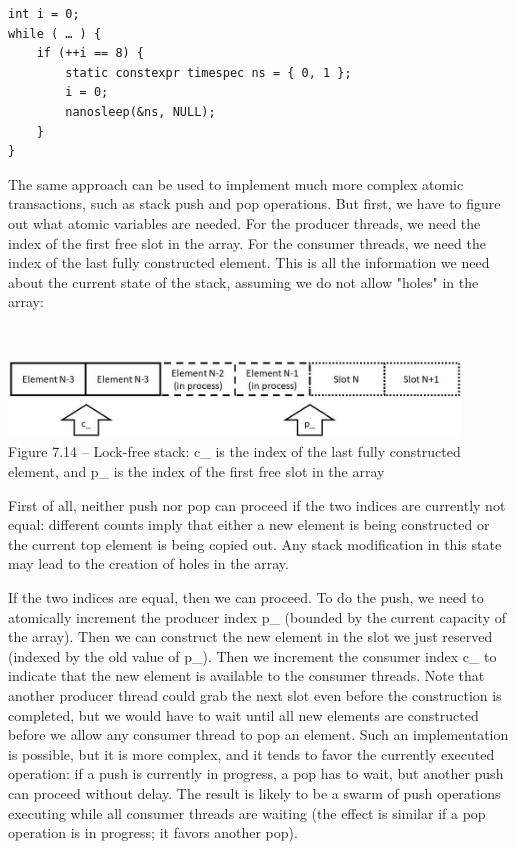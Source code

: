 \begin{lstlisting}[style=styleCXX]
int i = 0;
while ( … ) {
	if (++i == 8) {
		static constexpr timespec ns = { 0, 1 };
		i = 0;
		nanosleep(&ns, NULL);
	}
}
\end{lstlisting}

The same approach can be used to implement much more complex atomic transactions, such as stack push and pop operations. But first, we have to figure out what atomic variables are needed. For the producer threads, we need the index of the first free slot in the array. For the consumer threads, we need the index of the last fully constructed element. This is all the information we need about the current state of the stack, assuming we do not allow "holes" in the array:

\hspace*{\fill} \\ %
\begin{center}
\includegraphics[width=0.9\textwidth]{content/2/chapter7/images/14.jpg}\\ Figure 7.14 – Lock-free stack: c\_ is the index of the last fully constructed element, and p\_ is the index of the first free slot in the array
\end{center}

First of all, neither push nor pop can proceed if the two indices are currently not equal: different counts imply that either a new element is being constructed or the current top element is being copied out. Any stack modification in this state may lead to the creation of holes in the array.

If the two indices are equal, then we can proceed. To do the push, we need to atomically increment the producer index p\_ (bounded by the current capacity of the array). Then we can construct the new element in the slot we just reserved (indexed by the old value of p\_). Then we increment the consumer index c\_ to indicate that the new element is available to the consumer threads. Note that another producer thread could grab the next slot even before the construction is completed, but we would have to wait until all new elements are constructed before we allow any consumer thread to pop an element. Such an implementation is possible, but it is more complex, and it tends to favor the currently executed operation: if a push is currently in progress, a pop has to wait, but another push can proceed without delay. The result is likely to be a swarm of push operations executing while all consumer threads are waiting (the effect is similar if a pop operation is in progress; it favors another pop).

